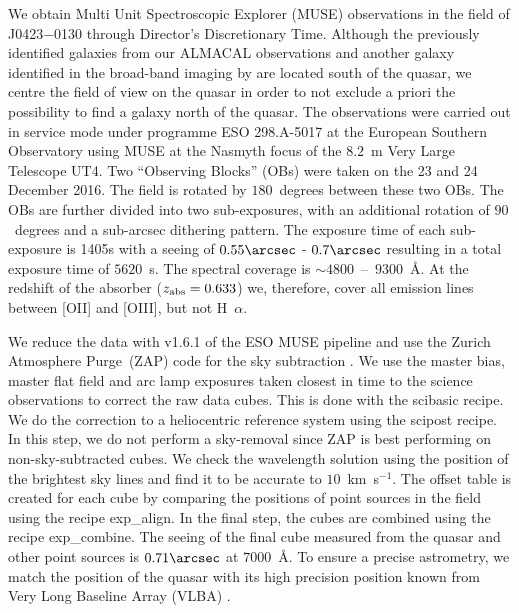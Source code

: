 \documentclass[a4paper,fleqn,usenatbib]{mnras}
\begin{document}
We obtain Multi Unit Spectroscopic Explorer (MUSE) observations in the field of J0423$-$0130 through Director's Discretionary Time. Although the previously identified galaxies from our ALMACAL observations and another galaxy identified in the broad-band imaging by \mbox{\citet{Rao2011groundbased}} are located south of the quasar, we centre the field of view on the quasar in order to not exclude a priori the possibility to find a galaxy north of the quasar. The observations were carried out in service mode under programme ESO 298.A-5017 at the European Southern Observatory using MUSE at the Nasmyth focus of the $8.2$~m Very Large Telescope UT4. Two ``Observing Blocks'' (OBs) were taken on the 23 and 24 December 2016. The field is rotated by $180$~degrees between these two OBs. The OBs are further divided into two sub-exposures, with an additional rotation of $90$~degrees and a sub-arcsec dithering pattern. 
The exposure time of each sub-exposure is 1405s with a seeing of $0.55\arcsec$ - $0.7\arcsec$ resulting in a total exposure time of $5620$~s. The spectral coverage is $\sim4800$~--~$9300$~\AA. At the redshift of the absorber ($z_{\rm abs}=0.633$) we, therefore, cover all emission lines between [OII] and [OIII], but not H~$\alpha$. 

We reduce the data with v1.6.1 of the ESO MUSE pipeline and use the Zurich Atmosphere Purge~(ZAP) code for the sky subtraction \mbox{\citep{Soto2016Zap}}. %
We use the master bias, master flat field and arc lamp exposures taken closest in time to the science observations to correct the raw data cubes. This is done with the {\sc scibasic} recipe. We do the correction to a heliocentric reference system using the {\sc scipost} recipe. In this step, we do not perform a sky-removal since ZAP is best performing on non-sky-subtracted cubes. We check the wavelength solution using the position of the brightest sky lines and find it to be accurate to $10$~km~s$^{-1}$. The offset table is created for each cube by comparing the positions of point sources in the field using the recipe {\sc exp\_align}. In the final step, the cubes are combined using the recipe {\sc exp\_combine}. 
The seeing of the final cube measured from the quasar and other point sources is $0.71\arcsec$ at $7000$~\AA. To ensure a precise astrometry, we match the position of the quasar with its high precision position known from Very Long Baseline Array (VLBA) \mbox{\citep{Lanyi2010celestrial}}.
\end{document}
